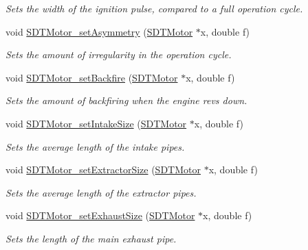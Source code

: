 \begin{DoxyCompactItemize}
\begin{DoxyCompactList}\small\item\em Sets the width of the ignition pulse, compared to a full operation cycle. \end{DoxyCompactList}\item 
void \hyperlink{group__motor_gad9a4854f47020082a99ae9a7f6195688}{S\+D\+T\+Motor\+\_\+set\+Asymmetry} (\hyperlink{group__motor_ga71a2e0e68d27c741a163f1b9819acb1b}{S\+D\+T\+Motor} $\ast$x, double f)
\begin{DoxyCompactList}\small\item\em Sets the amount of irregularity in the operation cycle. \end{DoxyCompactList}\item 
void \hyperlink{group__motor_gaa7fee7082e9f8de4b49e0fd65a22ff58}{S\+D\+T\+Motor\+\_\+set\+Backfire} (\hyperlink{group__motor_ga71a2e0e68d27c741a163f1b9819acb1b}{S\+D\+T\+Motor} $\ast$x, double f)
\begin{DoxyCompactList}\small\item\em Sets the amount of backfiring when the engine revs down. \end{DoxyCompactList}\item 
void \hyperlink{group__motor_gafc68a7323ed663a6d640cc8edd31c03b}{S\+D\+T\+Motor\+\_\+set\+Intake\+Size} (\hyperlink{group__motor_ga71a2e0e68d27c741a163f1b9819acb1b}{S\+D\+T\+Motor} $\ast$x, double f)
\begin{DoxyCompactList}\small\item\em Sets the average length of the intake pipes. \end{DoxyCompactList}\item 
void \hyperlink{group__motor_ga54ffb4c0b609969d8b52b22c99b9cc4c}{S\+D\+T\+Motor\+\_\+set\+Extractor\+Size} (\hyperlink{group__motor_ga71a2e0e68d27c741a163f1b9819acb1b}{S\+D\+T\+Motor} $\ast$x, double f)
\begin{DoxyCompactList}\small\item\em Sets the average length of the extractor pipes. \end{DoxyCompactList}\item 
void \hyperlink{group__motor_ga35cbf60595115242bf8e29a7443612a5}{S\+D\+T\+Motor\+\_\+set\+Exhaust\+Size} (\hyperlink{group__motor_ga71a2e0e68d27c741a163f1b9819acb1b}{S\+D\+T\+Motor} $\ast$x, double f)
\begin{DoxyCompactList}\small\item\em Sets the length of the main exhaust pipe. \end{DoxyCompactList}\item 

\end{DoxyCompactItemize}
